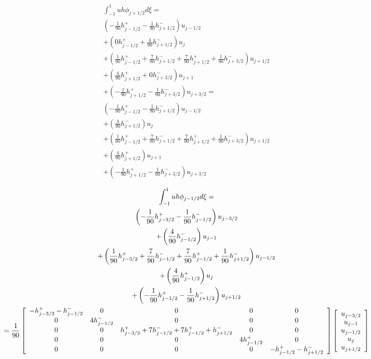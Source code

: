 \documentclass[12pt]{article}
\begin{document}
\begin{multline*}
\int_{-1}^{1} uh \phi_{j+1/2}d \xi =\\  \left(-\frac{1}{90}h^+ _{j - 1/2} -\frac{1}{90} h^- _{j + 1/2} \right) u_{j - 1/2}\\
+  \left(0h^+ _{j - 1/2} + \frac{4}{90}h^- _{j + 1/2} \right) u_{j}\\
+ \left(\frac{1}{90}h^+ _{j - 1/2} + \frac{7}{90}h^- _{j + 1/2} + \frac{7}{90}h^+ _{j + 1/2} + \frac{1}{90}h^- _{j + 3/2} \right) u_{j + 1/2} \\
+ \left(\frac{4}{90}h^+ _{j + 1/2} + 0h^- _{j + 3/2} \right) u_{j + 1}\\
+ \left( -\frac{1}{90}h^+ _{j + 1/2} -\frac{1}{90} h^- _{j + 3/2} \right) u_{j + 3/2} = \\ \left(-\frac{1}{90}h^+ _{j - 1/2} -\frac{1}{90} h^- _{j + 1/2} \right) u_{j - 1/2}\\
+  \left( \frac{4}{90}h^- _{j + 1/2} \right) u_{j}\\
+ \left(\frac{1}{90}h^+ _{j - 1/2} + \frac{7}{90}h^- _{j + 1/2} + \frac{7}{90}h^+ _{j + 1/2} + \frac{1}{90}h^- _{j + 3/2} \right) u_{j + 1/2} \\
+ \left(\frac{4}{90}h^+ _{j + 1/2} \right) u_{j + 1}\\
+ \left( -\frac{1}{90}h^+ _{j + 1/2} -\frac{1}{90} h^- _{j + 3/2} \right) u_{j + 3/2}
\end{multline*}
\newpage

\begin{landscape}
	\begin{multline*}
	\int_{-1}^{1} uh \phi_{j-1/2}d \xi = \\
	\left(-\frac{1}{90}h^+ _{j - 3/2} - \frac{1}{90}h^- _{j - 1/2}  \right) u_{j - 3/2}\\
	+ \left(\frac{4}{90}h^- _{j - 1/2}  \right) u_{j - 1} \\
	+ \left(\frac{1}{90}h^+ _{j - 3/2} + \frac{7}{90}h^- _{j - 1/2} + \frac{7}{90} h^+ _{j - 1/2} +   \frac{1}{90}h^- _{j + 1/2} \right) u_{j - 1/2} \\
	+\left( \frac{4}{90} h^+ _{j - 1/2}   \right) u_{j} \\ 
	+\left( -\frac{1}{90}h^+ _{j - 1/2} -  \frac{1}{90}h^- _{j + 1/2} \right) u_{j + 1/2} \\
	= \frac{1}{90} \left[\begin{array}{c c c c c}
	- h^+ _{j - 3/2} - h^- _{j - 1/2} & 0 & 0 &0 &0  \\
	0 &4h^- _{j - 1/2} & 0 & 0 &0\\
	0 & 0 &h^+ _{j - 3/2} + 7h^- _{j - 1/2} + 7 h^+ _{j - 1/2} +   h^- _{j + 1/2} & 0 & 0 \\ 
	0 & 0 & 0 & 4 h^+ _{j - 1/2} & 0 \\ 
	0 & 0 & 0 & 0 & -h^+ _{j - 1/2} -  h^- _{j + 1/2} \end{array}\right] 
	\left[\begin{array}{c}u_{j-3/2} \\u_{j-1}\\u_{j-1/2} \\ u_{j} \\ u_{j+1/2} \end{array}\right]
	\end{multline*}
\end{landscape}
\end{document}
